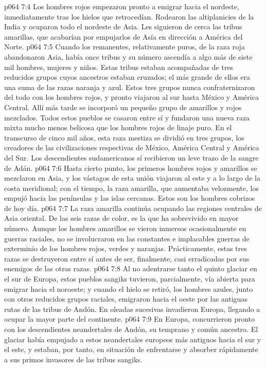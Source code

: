 \vs p064 7:4 Los hombres rojos empezaron pronto a emigrar hacia el nordeste, inmediatamente tras los hielos que retrocedían. Rodearon las altiplanicies de la India y ocuparon todo el nordeste de Asia. Les siguieron de cerca las tribus amarillas, que acabarían por empujarlos de Asía en dirección a América del Norte.
\vs p064 7:5 Cuando los remanentes, relativamente puros, de la raza roja abandonaron Asia, había once tribus y su número ascendía a algo más de siete mil hombres, mujeres y niños. Estas tribus estaban acompañadas de tres reducidos grupos cuyos ancestros estaban cruzados; el más grande de ellos era una suma de las razas naranja y azul. Estos tres grupos nunca confraternizaron del todo con los hombres rojos, y pronto viajaron al sur hasta México y América Central. Allí más tarde se incorporó un pequeño grupo de amarillos y rojos mezclados. Todos estos pueblos se casaron entre sí y fundaron una nueva raza mixta mucho menos belicosa que los hombres rojos de linaje puro. En el transcurso de cinco mil años, esta raza mestiza se dividió en tres grupos, los creadores de las civilizaciones respectivas de México, América Central y América del Sur. Los descendientes sudamericanos sí recibieron un leve trazo de la sangre de Adán.
\vs p064 7:6 Hasta cierto punto, los primeros hombres rojos y amarillos se mezclaron en Asia, y los vástagos de esta unión viajaron al este y a lo largo de la costa meridional; con el tiempo, la raza amarilla, que aumentaba velozmente, los empujó hacia las penínsulas y las islas cercanas. Estos son los hombres cobrizos de hoy día.
\vs p064 7:7 La raza amarilla continúa ocupando las regiones centrales de Asia oriental. De las seis razas de color, es la que ha sobrevivido en mayor número. Aunque los hombres amarillos se vieron inmersos ocasionalmente en guerras raciales, no se involucraron en las constantes e implacables guerras de exterminio de los hombres rojos, verdes y naranjas. Prácticamente, estas tres razas se destruyeron entre sí antes de ser, finalmente, casi erradicadas por sus enemigos de las otras razas.
\vs p064 7:8 Al no adentrarse tanto el quinto glaciar en el sur de Europa, estos pueblos sangiks tuvieron, parcialmente, vía abierta para emigrar hacia el noroeste; y cuando el hielo se retiró, los hombres azules, junto con otros reducidos grupos raciales, emigraron hacia el oeste por las antiguas rutas de las tribus de Andón. En oleadas sucesivas invadieron Europa, llegando a ocupar la mayor parte del continente.
\vs p064 7:9 En Europa, concurrieron pronto con los descendientes neandertales de Andón, su temprano y común ancestro. El glaciar había empujado a estos neandertales europeos más antiguos hacia el sur y el este, y estaban, por tanto, en situación de enfrentarse y absorber rápidamente a sus primos invasores de las tribus sangiks.
